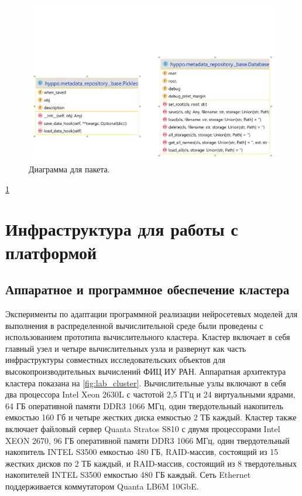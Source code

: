 \begin{figure}[h!]
    \centering
    \includegraphics[width=0.9\linewidth]{images/_repo.pdf}
    \caption{Диаграмма для пакета.}\label{fig:repo}
\end{figure}
\cref{fig:repo}

\section{Инфраструктура для работы с платформой}\label{sect_4_5}

\subsection{Аппаратное и программное обеспечение кластера}\label{sect_4_5_1}

Эксперименты по адаптации программной реализации нейросетевых моделей для выполнения в распределенной 
вычислительной среде были проведены с использованием прототипа вычислительного кластера. Кластер включает в 
себя главный узел и четыре вычислительных узла и развернут как часть инфраструктуры совместных исследовательских 
объектов для высокопроизводительных вычислений ФИЦ ИУ РАН. Аппаратная архитектура кластера показана на 
\cref{fig:lab_cluster}. Вычислительные узлы включают в себя два процессора Intel Xeon 2630L с частотой 2,5 ГГц и 
24 виртуальными ядрами, 64 ГБ оперативной памяти DDR3 1066 МГц, один твердотельный накопитель емкостью 160 Гб и 
четыре жестких диска емкостью 2 ТБ каждый. Кластер также включает файловый сервер Quanta Stratos S810 с двумя 
процессорами Intel XEON 2670, 96 ГБ оперативной памяти DDR3 1066 МГц, один твердотельный накопитель INTEL S3500 
емкостью 480 ГБ, RAID-массив, состоящий из 15 жестких дисков по 2 ТБ каждый, и RAID-массив, состоящий из 
8 твердотельных накопителей INTEL S3500 емкостью 480 ГБ каждый. Сеть Ethernet поддерживается коммутатором 
Quanta LB6M 10GbE.

